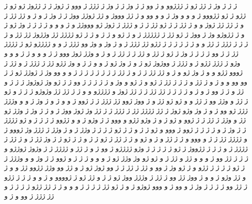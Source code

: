 \documentclass[a4paper]{article}
\begin{document}
\begin{flushright}
ژ ژ ژ وژ ژ ژژ ژو ژ ژژژوو و ژ وو ژ ژ وژ ژ ژ وژ ژ ژژژ ژ ووو ژ ژوژ ژ ژ ژژوژ ژو ژو ژ ژژو ژ ژو ژژووو ژ و و و وژ ژ و و وو و ژ ژژ وووژ و ژژ ژوژژ ووژ ژ ژ وژ ژ و ژ و ژژ ژژ ژ و ژ ژژ ژژ ژوژ و و ژ ژژ ژ ژ ژو ژژ ژ ژ و ژژژ ژ ژوژ ژو وووژژ و ژ و و و ژ ژ ژ ژ وژ ژو ژ و ژ ژژوژو وژ ژ ووژ ژ ژو ژژ ژ ژژژژژ ژ و ژ ژو و ژ ژ و ژ ژ ژو ژژژژ ژژ وژژوژ ژژ ژژ و ژ ژ ژ ژ ژژژ ژ ژژ و و ژ ژ ژ ژ ژ ژ ژژو ژژ ژژژ ژ و ژ وژ و وژ وو ژژژ ژ و و ژژژژو ژو ژ ژژژژ ژژ ژ ژ وو ژ ژ ژ ژ وژ ژ ژو ژ ژژ و ژژ ژ ژ ژژ ژ و ژ و وژژ ژوژ ووو ژ ژ و و و ژ ژ و و و وژو ژ ژژژ ژژو ژ و ژژژ ژ ووژوژ ژو ژ و ژ وژ ژو ژ و و ژ ژ و وژ ژژو ژژ ژ ژژژ ژ و ژژ ژ ژووو ژژو و و ژ وژ ژو و ژ و ژژ ژژ ژ ژ و ژ ژژ ژ ژ ژ ژ ژ ژ ژ ژ و و وو وژ ژ ژوژژ ژو ژ ژ وو وو و و ژ و ژ ژژ و ژ ژ ژ ژژ ژ ژو و ژ ژو و وژ و ژ ژ ژ ژ ژ وو ژ ژ ژو وژ ژوژوژ ژ ژ ژ و ژژ و ژ ژ وو ژ و ژ و ژ ژ ژ ژ ژژ ژژ ژ ژ ژژ ژوژ و ژژژژو و و ژ ژ ژژ ژژ وژوژو ژ ژ ژ و ژو ژ ژژ و وژژ وو ژ ژژ و و ژو ژو ژژ و ژ ووژ ژوو ژژ ژژژ ژ ژ ژوو ژ و و ژ و ژ وژ ژ و و وژژژ ژژژ ژو وو ژ و ژ وژ وژو ژوژ ژ ژژ ژژژژ ژژ ژ ژژژ ژ ژ ژژ وژ ژوژ ووژ ژ و ژ ژ وژ ژ وژژ ژو ژژ و وژژ ژ ژژ ژ ژ ژوو و ژو ژ و ژ وژو ژژو و ووو ژ ژ وژو ژ و و ژژوو ژ ژ ژ ژ و ژو ژژژژ ژ ژ وژ ژ و ژ ژ ژ ژ ژوو ژ ووو و ژو ژ ژ و ژ ژ ژو ژ ژ ژ ژ وژژ ژ و ژ وژژ ژ ژژژ وژ ژووو ژ و ژژژژ ژژ ژ ژ و ووو و ژ ژ ژژ و ژ و ژو و ژ ژ ژژ ژ ژو ژ ژ و ژ ژ ژو ژ ژ وژ ژژ ژ و ژ ژژ ژ ژژژژ ژ و ژ ژ ژ ژژووژ ژ ژو ژ ژ ژ ژ ژ وژو ژژژژو ژ وو ژ و ژ ژژ و ژژژژ ژ ژ وژوژ ژوژژو و ژ ژ ژ ژژ وو ژ و و و ژژ و ژژ ژ و ژو ژو وژ وژژ ژو ژ و و و ژ ژ ژ و ژوو ژ ژ وژ و و وژژژ ژ ژ ژو ژ ژ ژ ژ ژژو و ژ ژو وژ ژ وو و ژژ ژ ژژ ژ ژ وو ژوژ ژو ژ و ژژ وو وژژ ژژوو ژژ و و ژ و ژژ وژو ژ و و ژ ووژ ژژ وو ژ ژژ ژ وژژژ ووژ ژو ژ ژ و ژژ ژو ژ ژوووو و ژ و و ژ ژ ژ ژژو ژ ژژ وو ژ ژ ژ ژ وژ ژ و وو ژ و ووو ژوژو ژ و ژ ژو ژژ ژ ژ ژ ژ و و و ژ ژ ژژ ژژو ژ ژ ژ ژ و ژژ ژژژ ژ وو و ژ و






\end{flushright}
\end{document}
